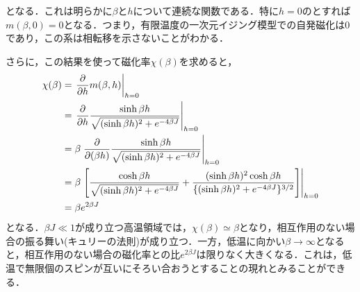 \documentclass[a4paper,11pt]{jsreport}
\begin{document}
となる．これは明らかに$\beta$と$h$について連続な関数である．特に$h=0$のとすれば$m(\beta, 0) = 0$となる．つまり，有限温度の一次元イジング模型での自発磁化は$0$であり，この系は相転移を示さないことがわかる．\par
さらに，この結果を使って磁化率$\chi(\beta)$を求めると，
\begin{align}
  \chi(\beta)
   & = \left.\frac{\partial}{\partial h} m(\beta, h)\right|_{h=0} \notag                                                                                                                                       \\
   & = \left.\frac{\partial}{\partial h} \frac{\sinh{\beta h}}{\sqrt{(\sinh{\beta h})^2 + e^{-4\beta J}}}\right|_{h=0} \notag                                                                                  \\
   & = \beta \left.\frac{\partial}{\partial (\beta h)} \frac{\sinh{\beta h}}{\sqrt{(\sinh{\beta h})^2 + e^{-4\beta J}}}\right|_{h=0} \notag                                                                    \\
   & = \beta \left.\left[ \frac{\cosh{\beta h}}{\sqrt{(\sinh{\beta h})^2 + e^{-4\beta J}}} +\frac{(\sinh{\beta h})^2 \cosh{\beta h}}{\{(\sinh{\beta h})^2 + e^{-4\beta J}\}^{3/2}} \right]\right|_{h=0} \notag \\
   & = \beta e^{2\beta J}
\end{align}
となる．$\beta J \ll 1$が成り立つ高温領域では，$\chi(\beta) \simeq \beta$となり，相互作用のない場合の振る舞い(キュリーの法則)が成り立つ．一方，低温に向かい$\beta \rightarrow \infty$となると，相互作用のない場合の磁化率との比$e^{2\beta J}$は限りなく大きくなる．これは，低温で無限個のスピンが互いにそろい合おうとすることの現れとみることができる．\par

\end{document}
